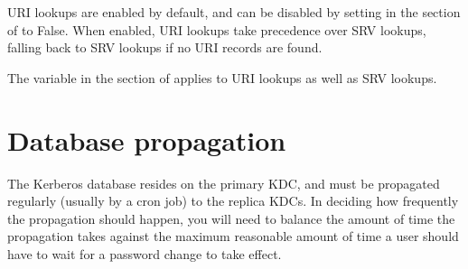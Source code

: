 \documentclass[letterpaper,10pt,english]{sphinxmanual}
\begin{document}
\begin{sphinxVerbatim}[commandchars=\\\{\}]
      
                           
                           
                           
\end{sphinxVerbatim}

\sphinxAtStartPar
URI lookups are enabled by default, and can be disabled by setting
 in the {\hyperref[\detokenize{admin/conf_files/krb5_conf:libdefaults}]{}} section of
{\hyperref[\detokenize{admin/conf_files/krb5_conf:krb5-conf-5}]{}} to False.  When enabled, URI lookups take
precedence over SRV lookups, falling back to SRV lookups if no URI
records are found.

\sphinxAtStartPar
The  variable in the {\hyperref[\detokenize{admin/conf_files/krb5_conf:realms}]{}} section of
{\hyperref[\detokenize{admin/conf_files/krb5_conf:krb5-conf-5}]{}} applies to URI lookups as well as SRV lookups.


\section{Database propagation}
\label{\detokenize{admin/realm_config:database-propagation}}\label{\detokenize{admin/realm_config:db-prop}}
\sphinxAtStartPar
The Kerberos database resides on the primary KDC, and must be
propagated regularly (usually by a cron job) to the replica KDCs.  In
deciding how frequently the propagation should happen, you will need
to balance the amount of time the propagation takes against the
maximum reasonable amount of time a user should have to wait for a
password change to take effect.
\end{document}

